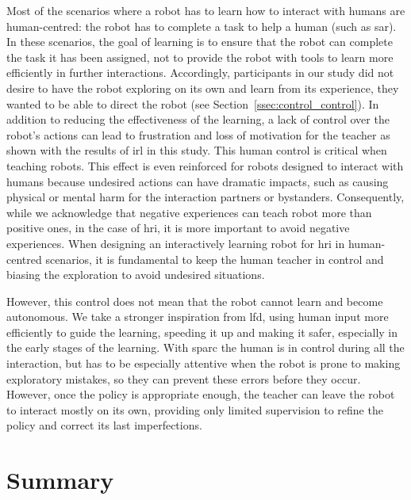 Most of the scenarios where a robot has to learn how to interact with humans are human-centred: the robot has to complete a task to help a human (such as \gls{sar}). In these scenarios, the goal of learning is to ensure that the robot can complete the task it has been assigned, not to provide the robot with tools to learn more efficiently in further interactions. Accordingly, participants in our study did not desire to have the robot exploring on its own and learn from its experience, they wanted to be able to direct the robot (see Section~\ref{ssec:control_control}). In addition to reducing the effectiveness of the learning, a lack of control over the robot's actions can lead to frustration and loss of motivation for the teacher as shown with the results of \gls{irl} in this study. This human control is critical when teaching robots. This effect is even reinforced for robots designed to interact with humans because undesired actions can have dramatic impacts, such as causing physical or mental harm for the interaction partners or bystanders. Consequently, while we acknowledge that negative experiences can teach robot more than positive ones, in the case of \gls{hri}, it is more important to avoid negative experiences. When designing an interactively learning robot for \gls{hri} in human-centred scenarios, it is fundamental to keep the human teacher in control and biasing the exploration to avoid undesired situations. 

However, this control does not mean that the robot cannot learn and become autonomous. We take a stronger inspiration from \gls{lfd}, using human input more efficiently to guide the learning, speeding it up and making it safer, especially in the early stages of the learning. With \gls{sparc} the human is in control during all  the interaction, but has to be especially attentive when the robot is prone to making exploratory mistakes, so they can prevent these errors before they occur. However, once the policy is appropriate enough, the teacher can leave the robot to interact mostly on its own, providing only limited supervision to refine the policy and correct its last imperfections.

\section{Summary}

